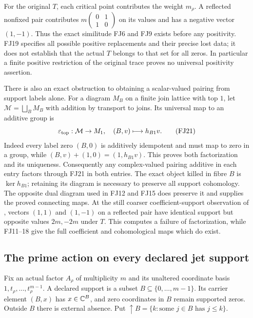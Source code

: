 For the original $T$, each critical point contributes the weight
$m_\rho$. A reflected nonfixed pair contributes
$m\left(\begin{smallmatrix}0&1\\1&0\end{smallmatrix}\right)$ on
its values and has a negative vector $(1,-1)$. Thus the exact
similitude FJ6 and FJ9 exists before any positivity. FJ19 specifies
all possible positive replacements and their precise lost data; it
does not establish that the actual $T$ belongs to that set for all
zeros. In particular a finite positive restriction of the original
trace proves no universal positivity assertion.

There is also an exact obstruction to obtaining a scalar-valued
pairing from support labels alone. For a diagram $M_B$ on a finite
join lattice with top $1$, let $\mathcal M=\bigsqcup_BM_B$ with
addition by transport to joins. Its universal map to an additive
group is
\[
 \varepsilon_{\rm top}:\mathcal M\to M_1,
       \quad(B,v)\longmapsto h_{B1}v.
 \tag{FJ21}\label{fj:fj:top}
\]
Indeed every label zero $(B,0)$ is additively idempotent and must
map to zero in a group, while
$(B,v)+(1,0)=(1,h_{B1}v)$. This proves both factorization and its
uniqueness. Consequently any complex-valued pairing additive in each
entry factors through FJ21 in both entries. The exact object killed
in fibre $B$ is $\ker h_{B1}$; retaining its diagram is necessary
to preserve all support cohomology. The opposite dual diagram used
in FJ12 and FJ15 does preserve it and supplies the proved connecting
maps. At the still coarser coefficient-support observation of
\cite{FJdivisor}, vectors $(1,1)$ and $(1,-1)$ on a reflected pair
have identical support but opposite values $2m,-2m$ under $T$.
This computes a failure of factorization, while FJ11--18 give the
full coefficient and cohomological maps which do exist.

\subsection{The prime action on every declared jet support}
Fix an actual factor $A_\rho$ of multiplicity $m$ and its unaltered
coordinate basis $1,t_\rho,\ldots,t_\rho^{m-1}$. A declared support is
a subset $B\subseteq\{0,\ldots,m-1\}$. Its carrier element $(B,x)$
has $x\in\mathbb C^B$, and zero coordinates in $B$ remain supported zeros.
Outside $B$ there is external absence. Put
$\uparrow B=\{k:\text{some }j\in B\text{ has }j\le k\}$.

